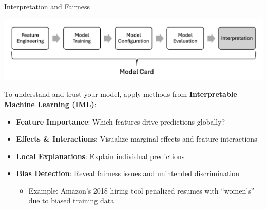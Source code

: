 \documentclass[10pt,compress,t,notes=noshow, xcolor=table]{beamer}
\begin{document}
\begin{frame}[t]{Interpretation and Fairness}
\label{interpretation}

\includegraphics[width=\linewidth, trim=0 60 0 0, clip]{figure_man/Modelling6.png}

\vspace{0.5em}
To understand and trust your model, apply methods from \textbf{Interpretable Machine Learning (IML)}:
\begin{itemize}
  \item \textbf{Feature Importance}: Which features drive predictions globally?
  \item \textbf{Effects \& Interactions}: Visualize marginal effects and feature interactions %
  \item \textbf{Local Explanations}: Explain individual predictions %
  \item \textbf{Bias Detection}: Reveal fairness issues and unintended discrimination
    \begin{itemize}
      \item Example: Amazon's 2018 hiring tool penalized resumes with “women's” due to biased training data %
    \end{itemize}
\end{itemize}
\end{frame}
\end{document}
